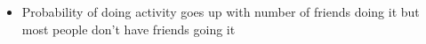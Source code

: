 \documentclass[aspectratio=169]{beamer}
\begin{document}
\begin{frame}

\setcounter{subfigure}{0}%
\begin{figure}
  \centering
  \hspace{0in}
\end{figure}

\vfill

\begin{itemize}
\item Probability of doing activity goes up with number of friends doing it but most people don't have friends going it
\end{itemize}

\end{frame}
\end{document}
